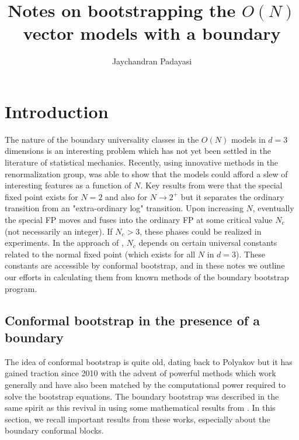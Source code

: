 \documentclass[a4paper,11pt]{article}
\title{\boldmath Notes on bootstrapping the $O(N)$ vector models with a boundary}
\author[a]{Jaychandran Padayasi}
\affiliation[a]{The Ohio State University,\\Columbus, OH, USA}
\begin{document}
 
\maketitle
\flushbottom

\section{Introduction}
\label{sec:intro}

The nature of the boundary universality classes in the $O(N)$ models in $d = 3$ dimensions is an interesting problem which has not yet been settled in the literature of statistical mechanics. Recently, using innovative methods in the renormalization group, \cite{Max} was able to show that the models could afford a slew of interesting features as a function of $N$. Key results from \cite{Max} were that the special fixed point exists for $N = 2$ and also for $N \rightarrow 2^+$ but it separates the ordinary transition from an "extra-ordinary log" transition. Upon increasing $N$, eventually the special FP moves and fuses into the ordinary FP at some critical value $N_c$ (not necessarily an integer). If $N_c > 3$, these phases could be realized in experiments. In the approach of \cite{Max}, $N_c$ depends on certain universal constants related to the normal fixed point (which exists for all $N$ in $d = 3$). These constants are accessible by conformal bootstrap, and in these notes we outline our efforts in calculating them from known methods of the boundary bootstrap program. 

\subsection{Conformal bootstrap in the presence of a boundary}
\label{sec:CBB}
The idea of conformal bootstrap is quite old, dating back to Polyakov \cite{Polyakov} but it has gained traction since 2010 with the advent of powerful methods which work generally and have also been matched by the computational power required to solve the bootstrap equations. The boundary bootstrap was described in the same spirit as this revival in \cite{Liendo} using some mathematical results from \cite{Mcavity}. In this section, we recall important results from these works, especially about the boundary conformal blocks.
\end{document}
